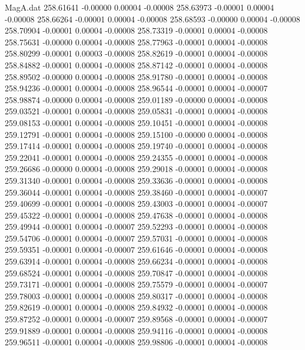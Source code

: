 \begin{filecontents}{MagA.dat}
 258.61641   -0.00000    0.00004   -0.00008
 258.63973   -0.00001    0.00004   -0.00008
 258.66264   -0.00001    0.00004   -0.00008
 258.68593   -0.00000    0.00004   -0.00008
 258.70904   -0.00001    0.00004   -0.00008
 258.73319   -0.00001    0.00004   -0.00008
 258.75631   -0.00000    0.00004   -0.00008
 258.77963   -0.00001    0.00004   -0.00008
 258.80299   -0.00001    0.00003   -0.00008
 258.82619   -0.00001    0.00004   -0.00008
 258.84882   -0.00001    0.00004   -0.00008
 258.87142   -0.00001    0.00004   -0.00008
 258.89502   -0.00000    0.00004   -0.00008
 258.91780   -0.00001    0.00004   -0.00008
 258.94236   -0.00001    0.00004   -0.00008
 258.96544   -0.00001    0.00004   -0.00007
 258.98874   -0.00000    0.00004   -0.00008
 259.01189   -0.00000    0.00004   -0.00008
 259.03521   -0.00001    0.00004   -0.00008
 259.05831   -0.00001    0.00004   -0.00008
 259.08153   -0.00001    0.00004   -0.00008
 259.10451   -0.00001    0.00004   -0.00008
 259.12791   -0.00001    0.00004   -0.00008
 259.15100   -0.00000    0.00004   -0.00008
 259.17414   -0.00001    0.00004   -0.00008
 259.19740   -0.00001    0.00004   -0.00008
 259.22041   -0.00001    0.00004   -0.00008
 259.24355   -0.00001    0.00004   -0.00008
 259.26686   -0.00000    0.00004   -0.00008
 259.29018   -0.00001    0.00004   -0.00008
 259.31340   -0.00001    0.00004   -0.00008
 259.33636   -0.00001    0.00004   -0.00008
 259.36044   -0.00001    0.00004   -0.00008
 259.38460   -0.00001    0.00004   -0.00007
 259.40699   -0.00001    0.00004   -0.00008
 259.43003   -0.00001    0.00004   -0.00007
 259.45322   -0.00001    0.00004   -0.00008
 259.47638   -0.00001    0.00004   -0.00008
 259.49944   -0.00001    0.00004   -0.00007
 259.52293   -0.00001    0.00004   -0.00008
 259.54706   -0.00001    0.00004   -0.00007
 259.57031   -0.00001    0.00004   -0.00008
 259.59351   -0.00001    0.00004   -0.00007
 259.61646   -0.00001    0.00004   -0.00008
 259.63914   -0.00001    0.00004   -0.00008
 259.66234   -0.00001    0.00004   -0.00008
 259.68524   -0.00001    0.00004   -0.00008
 259.70847   -0.00001    0.00004   -0.00008
 259.73171   -0.00001    0.00004   -0.00008
 259.75579   -0.00001    0.00004   -0.00007
 259.78003   -0.00001    0.00004   -0.00008
 259.80317   -0.00001    0.00004   -0.00008
 259.82619   -0.00001    0.00004   -0.00008
 259.84932   -0.00001    0.00004   -0.00008
 259.87252   -0.00001    0.00004   -0.00007
 259.89568   -0.00001    0.00004   -0.00007
 259.91889   -0.00001    0.00004   -0.00008
 259.94116   -0.00001    0.00004   -0.00008
 259.96511   -0.00001    0.00004   -0.00008
 259.98806   -0.00001    0.00004   -0.00008

\end{filecontents}
